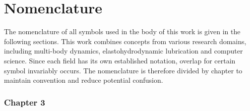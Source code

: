 \allowdisplaybreaks

\chapter*{Nomenclature}

The nomenclature of all symbols used in the body of this work is given in the following sections. This work combines concepts from various research domains, including multi-body dynamics, elastohydrodynamic lubrication and computer science. Since each field has its own established notation, overlap for certain symbol invariably occurs. The nomenclature is therefore divided by chapter to maintain convention and reduce potential confusion.

\subsection*{Chapter 3}

